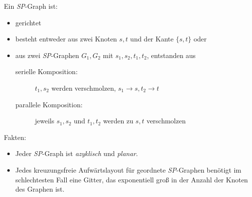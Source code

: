 Ein \textit{SP}-Graph ist:
	\begin{itemize}[itemsep=-1pt]
		\item gerichtet
		\item besteht entweder aus zwei Knoten $s,t$ und der Kante $\{s,t\}$ oder
		\item aus zwei \textit{SP}-Graphen $G_1,G_2$ mit $s_1,s_2,t_1,t_2$, entstanden aus
			\begin{description}
				\item[serielle Komposition:] $t_1,s_2$ werden verschmolzen, $s_1 \rightarrow s,t_2\rightarrow t$
				\item[parallele Komposition:] jeweils $s_1,s_2$ und $t_1,t_2$ werden zu $s,t$ verschmolzen
			\end{description}
	\end{itemize}
Fakten:
\begin{itemize}[itemsep=-1pt]
	\item Jeder \textit{SP}-Graph ist \textit{azyklisch} und \textit{planar}.
	\item Jedes kreuzungsfreie Aufwärtslayout für geordnete \textit{SP}-Graphen benötigt im schlechtesten Fall eine Gitter, das exponentiell groß in der Anzahl der Knoten des Graphen ist.
		\vspace*{-1.5\baselineskip}
		\Proof
		
\end{itemize}
\topbreak
\vspace*{-2\baselineskip}
